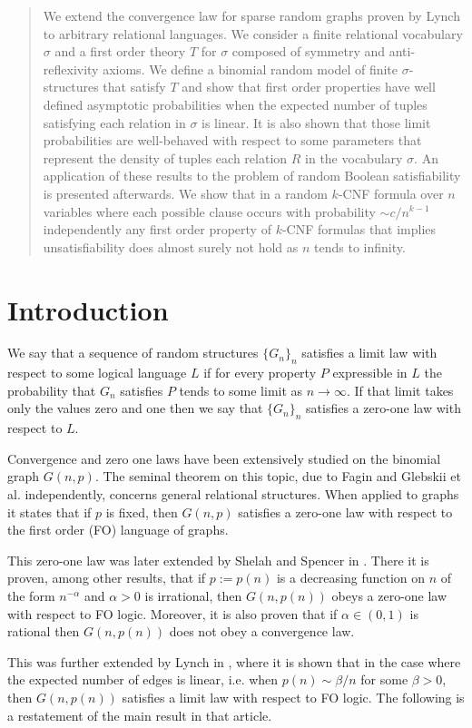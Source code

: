 \documentclass[12pt,notitlepage,a4paper]{article}
\theoremstyle{definition}
\begin{document}
\begin{abstract}
	We extend the convergence law for sparse random graphs proven
	by Lynch to arbitrary relational languages.
	We consider a finite relational vocabulary $\sigma$
	and a first order theory $T$ for $\sigma$ 
    composed of symmetry and 
    anti-reflexivity axioms. We define a binomial random model of finite 
    $\sigma$-structures that satisfy $T$ and show that first order properties have 
    well defined asymptotic probabilities when the expected number of tuples satisfying
    each relation in $\sigma$ is linear.
    It is also shown that those limit probabilities are well-behaved with
    respect to some parameters that represent the density of tuples each relation $R$ 
    in the vocabulary $\sigma$. 
    An application of these results to the problem of random Boolean 
    satisfiability is presented afterwards. 
    We show that in a random $k$-CNF formula over $n$ variables where
    each possible clause occurs with probability $\sim c/n^{k-1}$ independently any 
    first order property of $k$-CNF formulas that
    implies unsatisfiability does almost surely not hold as $n$ tends to infinity.
   
\end{abstract}
\clearpage

\section*{Introduction}

We say that a sequence of random structures $\{G_n\}_n$ satisfies a limit
law with respect to some logical language $L$ if for every property $P$ expressible in
$L$ the probability that $G_n$ satisfies $P$ tends to some limit as $n \to \infty$.
If that limit takes only the values zero and one then we say that $\{G_n\}_n$ satisfies
a zero-one law with respect to $L$.  \par
Convergence and zero one laws have been extensively studied on the binomial graph $G(n,p)$.
The seminal theorem on this topic, due to Fagin \cite{fagin1976probabilities}
and Glebskii et al. \cite{glebskii1969range} independently, 
concerns general relational structures.
When applied to graphs it states that if $p$ is fixed,
then $G(n,p)$ satisfies a zero-one law with respect to the first order
(FO) language of graphs. \par
This zero-one law was later extended by Shelah and Spencer
in \cite{shelah1988zero}. There it is proven, among other results,
that if $p:=p(n)$ is a decreasing function on
$n$ of the form $n^{-\alpha}$ and $\alpha>0$ is irrational,
then $G(n,p(n))$ obeys a zero-one law with respect to FO logic. Moreover, 
it is also proven that if $\alpha\in (0,1)$ is rational then $G(n,p(n))$ 
does not obey a convergence law. \par
This was further extended by Lynch
in \cite{lynch1992probabilities}, where it is shown that in the
case where the expected number of edges is linear, i.e. when $p(n)\sim \beta/n$
for some $\beta >0$, then $G(n,p(n))$ satisfies a limit law with
respect to FO logic. The following is a restatement of the main result
in that article.
\end{document}
